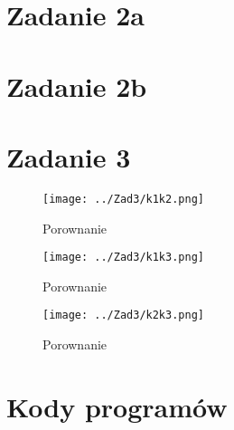 





 



\section*{Zadanie 2a}


\section*{Zadanie 2b}



\section*{Zadanie 3}

\newcommand{\ww}{1} 
\begin{figure}[H] 
    \texttt{[image: ../Zad3/k1k2.png]}
    \caption{Porownanie}
\end{figure} 


\begin{figure}[H] 
    \texttt{[image: ../Zad3/k1k3.png]}
    \caption{Porownanie}
\end{figure} 


\begin{figure}[H] 
    \texttt{[image: ../Zad3/k2k3.png]}
    \caption{Porownanie}
\end{figure} 
\let\ww\undefined 

% 
% 

% 
% 

\newpage \section*{Kody programów}

